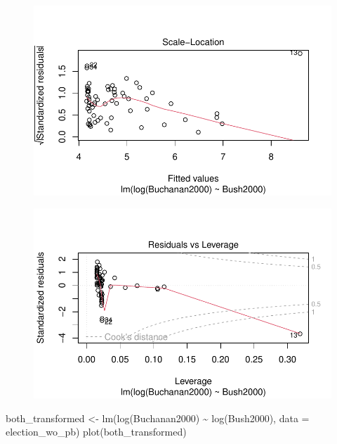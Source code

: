 \documentclass[
  letterpaper,
  DIV=11,
  numbers=noendperiod]{scrartcl}
\newenvironment{Shaded}{\begin{snugshade}}{\end{snugshade}}
\newcommand{\AttributeTok}[1]{\textcolor[rgb]{0.40,0.45,0.13}{#1}}
\newcommand{\FunctionTok}[1]{\textcolor[rgb]{0.28,0.35,0.67}{#1}}
\newcommand{\NormalTok}[1]{\textcolor[rgb]{0.00,0.23,0.31}{#1}}
\newcommand{\OtherTok}[1]{\textcolor[rgb]{0.00,0.23,0.31}{#1}}
\newcommand{\SpecialCharTok}[1]{\textcolor[rgb]{0.37,0.37,0.37}{#1}}
\begin{document}
\begin{figure}[H]

{\centering \includegraphics{case_study_1_files/figure-pdf/unnamed-chunk-4-3.pdf}

}

\end{figure}

\begin{figure}[H]

{\centering \includegraphics{case_study_1_files/figure-pdf/unnamed-chunk-4-4.pdf}

}

\end{figure}

\begin{Shaded}
\begin{Highlighting}[]
\NormalTok{both\_transformed }\OtherTok{\textless{}{-}} \FunctionTok{lm}\NormalTok{(}\FunctionTok{log}\NormalTok{(Buchanan2000) }\SpecialCharTok{\textasciitilde{}} \FunctionTok{log}\NormalTok{(Bush2000), }\AttributeTok{data =}\NormalTok{ election\_wo\_pb)}
\FunctionTok{plot}\NormalTok{(both\_transformed)}
\end{Highlighting}
\end{Shaded}
\end{document}
